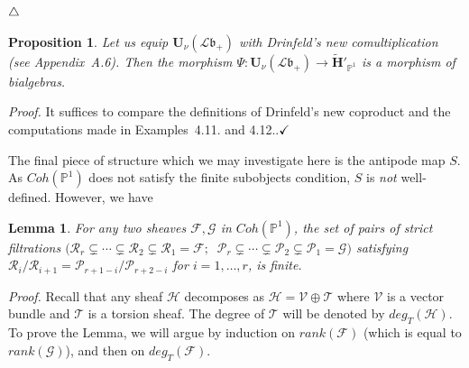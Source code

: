 \documentclass[a4paper,10pt]{amsart}
\def\H{\mathbf{H}}
\def\U{\mathbf{U}}
\def\qed{$\hfill \checkmark$}
\def\endexample{$\hfill \triangle$}
\def\bo{\mathfrak{b}}
\newtheorem{lem}[theo]{Lemma}
\newtheorem{prop}[theo]{Proposition}
\numberwithin{equation}{section}
\begin{document}
{\endexample

\vspace{.15in}

\begin{prop} Let us equip $\U_{\nu}(\mathcal{L}\bo_+)$ with Drinfeld's new comultiplication (see Appendix~A.6). Then the morphism $\Psi: \U_{\nu}(\mathcal{L}\bo_+) \to \widetilde{\H}'_{\mathbb{P}^1}$ is a morphism of bialgebras.\end{prop}

\noindent
\textit{Proof.} It suffices to compare the definitions of Drinfeld's new coproduct and the computations made in Examples~4.11. and 4.12..\qed

\vspace{.15in}

The final piece of structure which we may investigate here is the antipode map $S$. As $Coh(\mathbb{P}^1)$ does not satisfy the finite subobjects condition, $S$ is \textit{not} well-defined. However, we have

\vspace{.1in}

\begin{lem} For any two sheaves $\mathcal{F},\mathcal{G}$ in $Coh(\mathbb{P}^1)$, the set of pairs of strict filtrations $\big( \mathcal{R}_r \subsetneq \cdots \subsetneq \mathcal{R}_2 \subsetneq \mathcal{R}_1=\mathcal{F}; \;\; \mathcal{P}_r \subsetneq \cdots \subsetneq \mathcal{P}_2 \subsetneq \mathcal{P}_1=\mathcal{G} \big)$ satisfying $\mathcal{R}_i/\mathcal{R}_{i+1}=\mathcal{P}_{r+1-i}/\mathcal{P}_{r+2-i}$ for $i=1, \ldots, r$, is finite.\end{lem}
\noindent
\textit{Proof.} Recall that any sheaf $\mathcal{H}$ decomposes as $\mathcal{H}=\mathcal{V}\oplus \mathcal{T}$ where $\mathcal{V}$ is a vector bundle and $\mathcal{T}$ is a torsion sheaf. The degree of $\mathcal{T}$ will be denoted by $deg_{T}(\mathcal{H})$. To prove the Lemma, we will argue by induction on $rank(\mathcal{F})$ (which is equal to $rank(\mathcal{G})$), and then on $deg_T(\mathcal{F})$.

}
\end{document}
